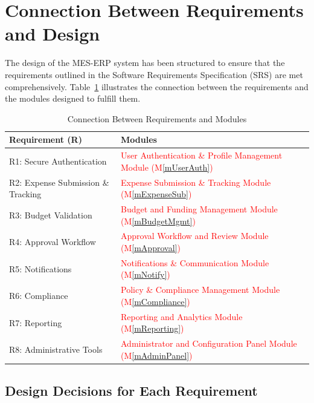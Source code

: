 \documentclass[12pt, titlepage]{article}
\newcommand{\mref}[1]{M\ref{#1}}
\begin{document}
\section{Connection Between Requirements and Design}

The design of the MES-ERP system has been structured to ensure that the requirements outlined in the Software Requirements Specification (SRS) are met comprehensively. Table~\ref{tab:req-to-modules} illustrates the connection between the requirements and the modules designed to fulfill them.

\begin{table}[h!]
\centering
\caption{Connection Between Requirements and Modules}
\label{tab:req-to-modules}

\begin{tabular}{|p{4cm}|p{8cm}|}
\hline
\textbf{Requirement (R)} & \textbf{Modules} \\
\hline
R1: Secure Authentication & \textcolor{red}{User Authentication \& Profile Management Module (\mref{mUserAuth})} \\
\hline
R2: Expense Submission \& Tracking & \textcolor{red}{Expense Submission \& Tracking Module (\mref{mExpenseSub})} \\
\hline
R3: Budget Validation & \textcolor{red}{Budget and Funding Management Module (\mref{mBudgetMgmt})} \\
\hline
R4: Approval Workflow & \textcolor{red}{Approval Workflow and Review Module (\mref{mApproval})} \\
\hline
R5: Notifications & \textcolor{red}{Notifications \& Communication Module (\mref{mNotify})} \\
\hline
R6: Compliance & \textcolor{red}{Policy \& Compliance Management Module (\mref{mCompliance})} \\
\hline
R7: Reporting & \textcolor{red}{Reporting and Analytics Module (\mref{mReporting})} \\
\hline
R8: Administrative Tools & \textcolor{red}{Administrator and Configuration Panel Module (\mref{mAdminPanel})} \\
\hline
\end{tabular}
\end{table}

\subsection{Design Decisions for Each Requirement}
\end{document}

